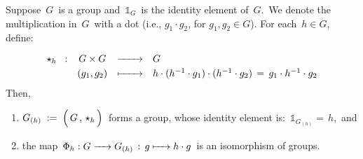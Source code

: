 \vskip 0.5cm
\begin{lemma}
\mbox{}
\vskip 0.05cm
\noindent
Suppose \,$G$\, is a group and \,$\mathds{1}_{G}$\, is the identity element of \,$G$.\,
We denote the multiplication in \,$G$\, with a dot (i.e., $g_{1} \cdot g_{2}$, for $g_{1}, g_{2} \in G$). 
For each \,$h \in G$,\, define:
\begin{equation*}
\begin{array}{cccl}
\star_{h} \;\; : & G \times G & \xrightarrow{{\color{white}22222}} & G
\\
& (g_{1},g_{2}) & \xmapsto{{\color{white}22222}} & h \cdot (h^{-1} \cdot g_{1}) \cdot (h^{-1} \cdot g_{2}) \,=\, g_{1} \cdot h^{-1} \cdot g_{2}
\end{array}
\end{equation*}
Then,
\begin{enumerate}
\item
	\vskip -0.1cm
	$G_{(h)} \; := \; \left(\,\overset{{\color{white}.}}{G}\,,\,\star_{h}\,\right)$\,
	forms a group, whose identity element is:
	\,$\mathds{1}_{G_{(h)}} = \, h$,\, and
\item
	the map
	\,$\Phi_{h} : G \xrightarrow{{\color{white}222}} G_{(h)} \,:\, g \xmapsto{{\color{white}222}} h \cdot g $\,
	is an isomorphism of groups.
\end{enumerate}
\end{lemma}
\proof

